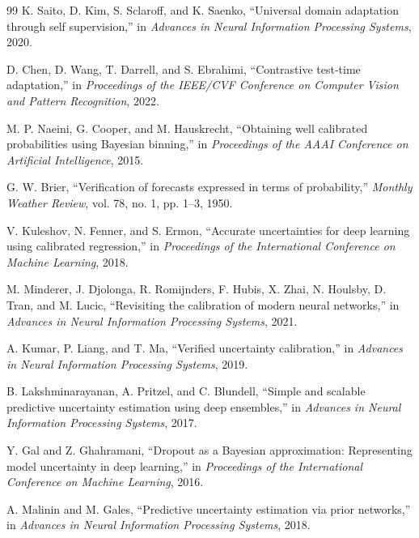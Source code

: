 \documentclass[10pt,conference]{IEEEtran}
\begin{document}
\begin{thebibliography}{99}
K. Saito, D. Kim, S. Sclaroff, and K. Saenko, ``Universal domain
adaptation through self supervision,'' in \emph{Advances in Neural
Information Processing Systems}, 2020.

D. Chen, D. Wang, T. Darrell, and S. Ebrahimi, ``Contrastive test-time
adaptation,'' in \emph{Proceedings of the IEEE/CVF Conference on Computer
Vision and Pattern Recognition}, 2022.

M. P. Naeini, G. Cooper, and M. Hauskrecht, ``Obtaining well calibrated
probabilities using Bayesian binning,'' in \emph{Proceedings of the AAAI
Conference on Artificial Intelligence}, 2015.

G. W. Brier, ``Verification of forecasts expressed in terms of
probability,'' \emph{Monthly Weather Review}, vol. 78, no. 1, pp. 1--3,
1950.

V. Kuleshov, N. Fenner, and S. Ermon, ``Accurate uncertainties for deep
learning using calibrated regression,'' in \emph{Proceedings of the
International Conference on Machine Learning}, 2018.

M. Minderer, J. Djolonga, R. Romijnders, F. Hubis, X. Zhai, N. Houlsby,
D. Tran, and M. Lucic, ``Revisiting the calibration of modern neural
networks,'' in \emph{Advances in Neural Information Processing Systems},
2021.

A. Kumar, P. Liang, and T. Ma, ``Verified uncertainty calibration,'' in
\emph{Advances in Neural Information Processing Systems}, 2019.

B. Lakshminarayanan, A. Pritzel, and C. Blundell, ``Simple and scalable
predictive uncertainty estimation using deep ensembles,'' in
\emph{Advances in Neural Information Processing Systems}, 2017.

Y. Gal and Z. Ghahramani, ``Dropout as a Bayesian approximation:
Representing model uncertainty in deep learning,'' in \emph{Proceedings
of the International Conference on Machine Learning}, 2016.

A. Malinin and M. Gales, ``Predictive uncertainty estimation via prior
networks,'' in \emph{Advances in Neural Information Processing Systems},
2018.


\end{thebibliography}
\end{document}
